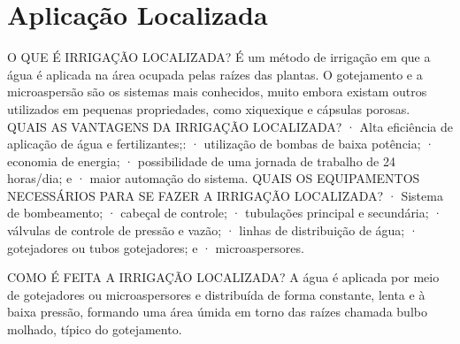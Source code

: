 \section{Aplica\c{c}\~ao Localizada} 

 O QUE É  IRRIGAÇÃO LOCALIZADA?
           É  um método de irrigação em que a água é aplicada na área ocupada pelas raízes das plantas. O gotejamento e a microaspersão são os sistemas mais conhecidos, muito embora existam outros utilizados em pequenas propriedades, como xiquexique e cápsulas porosas.
 QUAIS AS VANTAGENS DA IRRIGAÇÃO LOCALIZADA?
 ·        Alta eficiência de aplicação de água e fertilizantes;:
·        utilização de bombas de baixa potência;
·        economia de energia;
·        possibilidade de uma jornada de trabalho de 24 horas/dia; e
·        maior  automação  do sistema.
QUAIS OS EQUIPAMENTOS NECESSÁRIOS PARA SE FAZER A IRRIGAÇÃO LOCALIZADA?
·        Sistema de bombeamento;
·        cabeçal de controle;
·        tubulações principal e secundária;
·        válvulas de controle de pressão e vazão;
·        linhas de distribuição de água;
·        gotejadores ou tubos gotejadores; e
·        microaspersores.
 
COMO É FEITA A IRRIGAÇÃO LOCALIZADA?
 A água é aplicada por meio de gotejadores ou microaspersores e distribuída de forma constante, lenta e à baixa pressão, formando uma área úmida em torno das raízes chamada bulbo molhado, típico do gotejamento.
 